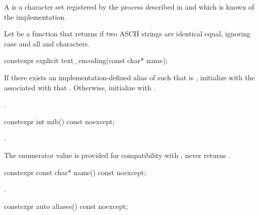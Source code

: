\documentclass{wg21}
\begin{document}
\begin{addedblock}
    
\pnum A  is a character set registered by the process described in \cite{rfc2978} and which is known of the implementation.

\pnum Let  be a function that returns  if two ASCII strings are identical equal, ignoring case and all \tcode{-} and  \tcode{_} characters.

\pnum 
    
\begin{itemdecl}
constexpr explicit text_encoding(const char* name);
\end{itemdecl}

\begin{itemdescr}
    \effects
    If there exists an implementation-defined alias  of  such that  is , initialize
     with the  associated with that . Otherwise, initialize  with .
 

    \ensures {}.
\end{itemdescr}


\begin{itemdecl}
constexpr int mib() const noexcept;
\end{itemdecl}

\begin{itemdescr}
\returns {}.

\begin{note}
	The enumerator value  is provided for compatibility with \cite{rfc3808}, 
	 never returns .
\end{note}

\end{itemdescr}

\begin{itemdecl}
constexpr const char* name() const noexcept;
\end{itemdecl}

\begin{itemdescr}
\returns {}.
\end{itemdescr}


\begin{itemdecl}
constexpr auto aliases() const noexcept;
\end{itemdecl}


\end{addedblock}
\end{document}
